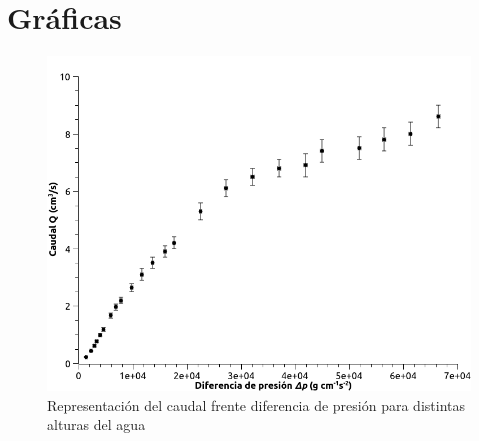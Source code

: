 \documentclass[a4paper,12pt,spanish]{article}
\begin{document}
	
	
	
	

	
	
	
	\section{Gráficas}
	
	
	
	\begin{figure}[H]
		\centering
		\includegraphics[width=0.9\linewidth]{graficas/caudal_presion}
		\caption{Representación del caudal frente diferencia de presión para distintas alturas del agua}
		\label{fig:caudalpresion}
	\end{figure}
	
\end{document}
